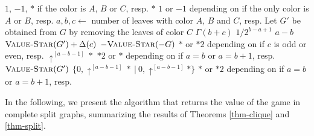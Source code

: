 \documentclass[a4paper,11pt]{article}
\begin{document}
\begin{algorithm}
\caption{Value of the game in Stars}\label{alg-star}
\begin{algorithmic}[1]
    
 \Return $1$, $-1$, $*$ if the color is $A$, $B$ or $C$, resp.\EndIf
{}
     \Return $*$\EndIf
    \State\Return $1$ or $-1$ depending on if the only color is $A$ or $B$, resp.
\EndIf
\State $a,b,c\gets$ number of leaves with color $A$, $B$ and $C$, resp.
\State Let $G'$ be obtained from $G$ by removing the leaves of color $C$
     \Return $\Gamma(b+c)$ \EndIf
     \Return $1/2^{b-a+1}$ \EndIf
     \Return $a-b$ \EndIf
    \State\Return $\textsc{Value-Star}(G')+\Delta(c)$
\EndIf
{}
    \Return $-\textsc{Value-Star}(-G)$
\EndIf
{}
     \Return $*$ or $*2$ depending on if $c$ is odd or even, resp.\EndIf
     \Return $\uparrow^{[a-b-1]}*$\EndIf
     \Return $*2$ or $*$ depending on if $a=b$ or $a=b+1$, resp.\EndIf
     \Return $\textsc{Value-Star}(G')$\EndIf
     \Return $\{0,\uparrow^{[a-b-1]}*\ |\ 0, \uparrow^{[a-b-1]}*\}$\EndIf
    \State\Return $*$ or $*2$ depending on if $a=b$ or $a=b+1$, resp.
\EndIf
\EndProcedure
\end{algorithmic}
\end{algorithm}


In the following, we present the algorithm that returns the value of the game in complete split graphs, summarizing the results of Theorems \ref{thm-clique} and \ref{thm-split}.
\end{document}
